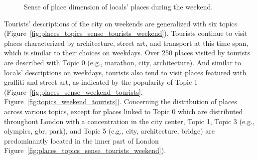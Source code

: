\documentclass{article}
\theoremstyle{remark}
\begin{document}
\begin{figure}[!h]
    \caption{Sense of place dimension of locals' places during the weekend.}
    \label{fig:places_topics_sense_locals_weekend}
\end{figure}

Tourists' descriptions of the city on weekends are generalized with six topics (Figure~\ref{fig:places_topics_sense_tourists_weekend}). Tourists continue to visit places characterized by architecture, street art, and transport at this time span, which is similar to their choices on weekdays. Over 250 places visited by tourists are described with Topic 0 (e.g., marathon, city, architecture). And similar to locals' descriptions on weekdays, tourists also tend to visit places featured with graffiti and street art, as indicated by the popularity of Topic 1 (Figure~\ref{fig:places_sense_weekend_tourists}, Figure~\ref{fig:topics_weekend_tourists}). Concerning the distribution of places across various topics, except for places linked to Topic 0 which are distributed throughout London with a concentration in the city center, Topic 1, Topic 3 (e.g., olympics, gbr, park), and Topic 5 (e.g., city, architecture, bridge) are predominantly located in the inner part of London Figure~\ref{fig:places_topics_sense_tourists_weekend}).
\end{document}
